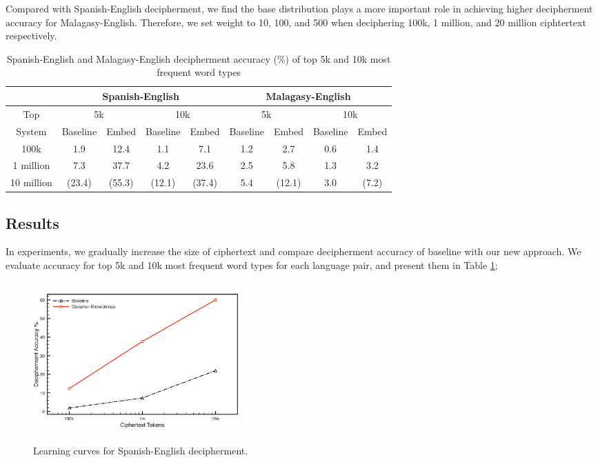 Compared with Spanish-English decipherment, we find the base distribution plays a more important role in achieving higher decipherment accuracy for Malagasy-English. Therefore, we set weight to 10, 100, and 500 when deciphering 100k, 1 million, and 20 million ciphtertext respectively.


%
 \begin{table}[!ht]
 \begin{center}
 \begin{tabular}{ |c|c|c|c|c|c|c|c|c| } \hline
         & \multicolumn{4}{|c|}{Spanish-English} & \multicolumn{4}{|c|}{Malagasy-English} \\ \hline
 Top &  \multicolumn{2}{|c|}{5k} & \multicolumn{2}{|c|}{10k} & \multicolumn{2}{|c|}{5k} & \multicolumn{2}{|c|}{10k} \\ \hline
 System &  Baseline & Embed & Baseline & Embed &  Baseline & Embed & Baseline & Embed \\ \hline
 100k &  1.9 & 12.4 & 1.1 & 7.1 &  1.2 & 2.7 & 0.6 & 1.4 \\ \hline
 1 million &  7.3 & 37.7& 4.2 & 23.6 &  2.5 & 5.8 & 1.3 & 3.2 \\ \hline
 10 million &  (23.4) & (55.3) & (12.1) & (37.4) &  5.4 & (12.1) & 3.0 & (7.2) \\ \hline
 \end{tabular}
 \caption{Spanish-English and Malagasy-English decipherment accuracy (\%) of top 5k and 10k most frequent word types}
 \label{decipher-acc-result}
 \end{center}
 \end{table}
%

\subsection{Results}
In experiments, we gradually increase the size of ciphertext and compare decipherment accuracy of baseline with our new approach. We evaluate accuracy for top 5k and 10k most frequent word types for each language pair, and present them in Table \ref{decipher-acc-result}; 


 \begin{figure}[!ht]
  \centering
  \includegraphics[width=3.1in,height=2.4in]{es_en_curve}
  \caption{Learning curves for Spanish-English decipherment.}
\label{es-en-curve}
\end{figure}

